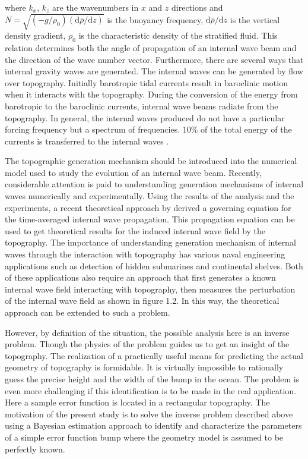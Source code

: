 \documentclass[12pt]{report}
\begin{document}
where $k_x$, $k_z$ are the wavenumbers in $x$ and $z$ directions and $N=\sqrt{(-g/\rho_0)(\mathrm{d}\bar{\rho}/\mathrm{d}z)}$ is the buoyancy frequency, $\mathrm{d}\bar{\rho}/\mathrm{d}z$ is the vertical density gradient, $\rho_0$ is the characteristic density of the stratified fluid. This relation determines both the angle of propagation of an internal wave beam and the direction of the wave number vector. Furthermore, there are several ways that internal gravity waves are generated. The internal waves can be generated by flow over topography. Initially barotropic tidal currents result in baroclinic motion when it interacts with the topography. During the conversion of the energy from barotropic to the baroclinic currents, internal wave beams radiate from the topography\cite{SutherlandBook,LightHillBook}. In general, the internal waves produced do not have a particular forcing frequency but a spectrum of frequencies\cite{ThorpeBook}. $10\%$ of the total energy of the currents is transferred to the internal waves \cite{Kunze}.

 The topographic generation mechanism should be introduced into the numerical model used to study the evolution of an internal wave beam. Recently, considerable attention is paid to understanding generation mechanisms of internal waves numerically \cite{Delwiche,Z&D2013} and experimentally\cite{Allshouse}. Using the results of the analysis and the experiments, a recent theoretical approach by \citet{Aksu2017} derived a governing equation for the time-averaged internal wave propagation. This propagation equation can be used to get theoretical results for the induced internal wave field by the topography. The importance of understanding generation mechanism of internal waves through the interaction with topography has various naval engineering applications such as detection of hidden submarines and continental shelves. Both of these applications also require an approach that first generates a known internal wave field interacting with topography, then measures the perturbation of the internal wave field as shown in figure 1.2. In this way, the theoretical approach\cite{Aksu2017} can be extended to such a problem.

However, by definition of the situation, the possible analysis here is an inverse problem.  Though the physics of the problem guides us to get an insight of the topography. The realization of a practically useful means for predicting the actual geometry of topography is formidable. It is virtually impossible to rationally guess the precise height and the width of the bump in the ocean.  The problem is even more challenging if this identification is to be made in the real application. Here a sample error function is located in a rectangular topography. The motivation of the present study is to solve the inverse problem described above using a Bayesian estimation approach\cite{Reed2015,Lin2017} to identify and characterize the parameters of a simple error function bump where the geometry model is assumed to be perfectly known. 
\end{document}
